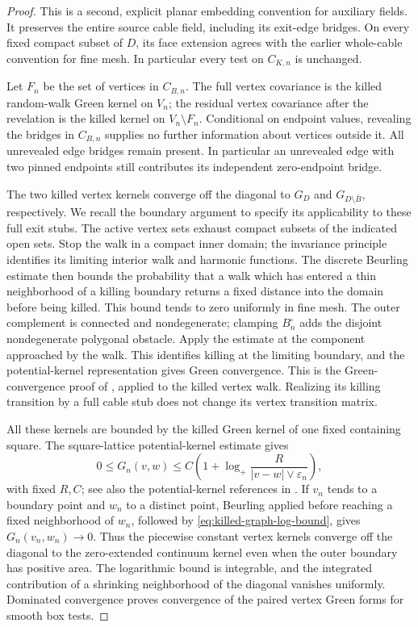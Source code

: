 \begin{proof}
This is a second, explicit planar embedding convention for auxiliary
fields. It preserves the entire source cable field, including its
exit-edge bridges. On every fixed compact subset of \(D\), its face
extension agrees with the earlier whole-cable convention for fine mesh.
In particular every test on \(C_{K,n}\) is unchanged.

Let \(F_n\) be the set of vertices in \(C_{B,n}\).
The full vertex covariance is the killed random-walk Green kernel on
\(V_n\); the residual vertex covariance after the revelation is the
killed kernel on \(V_n\setminus F_n\). Conditional on endpoint values,
revealing the bridges in \(C_{B,n}\) supplies no further information
about vertices outside it. All unrevealed edge bridges remain present.
In particular an unrevealed edge with two pinned endpoints still
contributes its independent zero-endpoint bridge.

The two killed vertex kernels converge off the diagonal to \(G_D\)
and \(G_{D\setminus\overline B}\), respectively. We recall the
boundary argument to specify its applicability to these full exit
stubs. The active vertex sets exhaust compact subsets of the indicated
open sets. Stop the walk in a compact inner domain; the invariance
principle identifies its limiting interior walk and harmonic functions.
The discrete Beurling estimate then bounds the probability that a walk
which has entered a thin neighborhood of a killing boundary returns a
fixed distance into the domain before being killed. This bound tends to
zero uniformly in fine mesh. The outer complement is connected and
nondegenerate; clamping \(B_n^\square\) adds the disjoint nondegenerate
polygonal obstacle. Apply the estimate at the component approached by
the walk. This identifies killing at the limiting boundary, and the
potential-kernel representation gives Green convergence. This is the
Green-convergence proof of \cite[Lemmas~4.1--4.2]{ALS2018}, applied to
the killed vertex walk. Realizing its killing transition by a full
cable stub does not change its vertex transition matrix.

All these kernels are bounded by the killed Green kernel of one fixed
containing square. The square-lattice potential-kernel estimate gives
\begin{equation}
 0\le G_n(v,w)\le
 C\left(1+\log_+\frac{R}{|v-w|\vee\varepsilon_n}\right),
 \label{eq:killed-graph-log-bound}
\end{equation}
with fixed \(R,C\); see also the potential-kernel references in
\cite[Appendix~B]{ABJL2023}. If \(v_n\) tends to a boundary point
and \(w_n\) to a distinct point, Beurling applied before reaching a
fixed neighborhood of \(w_n\), followed by
\eqref{eq:killed-graph-log-bound}, gives \(G_n(v_n,w_n)\to0\).
Thus the piecewise constant vertex kernels converge off the diagonal
to the zero-extended continuum kernel even when the outer boundary has
positive area. The logarithmic bound is integrable, and the integrated
contribution of a shrinking neighborhood of the diagonal vanishes
uniformly. Dominated convergence proves convergence of the paired
vertex Green forms for smooth box tests.


\end{proof}
